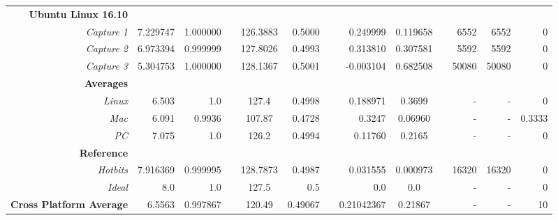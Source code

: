 \documentclass{IEEEtran}
\begin{document}
\begin{table*}[h!]
\begin{adjustwidth}{-1.25 cm}{}
\begin{tabular}{@{}rrrrcrrrcrrrr@{}}
\textbf{Ubuntu Linux 16.10}\\
\textit{Capture 1} & 7.229747 & 1.000000  && 126.3883 & 0.5000 && 0.249999 & 0.119658 && 6552 & 6552 & 0 \\
\textit{Capture 2}& 6.973394& 0.999999&& 127.8026& 0.4993&& 0.313810& 0.307581 && 5592 & 5592 &0\\
\textit{Capture 3}& 5.304753& 1.000000&& 128.1367& 0.5001&&-0.003104& 0.682508&& 50080 & 50080 & 0\\
\bottomrule
\textbf{Averages}\\
\textit{Linux}& 6.503 & 1.0 && 127.4 &0.4998  && 0.188971  & 0.3699 && - & - & 0\\
\textit{Mac}& 6.091 & 0.9936&& 107.87 &0.4728 && 0.3247 & 0.06960 && - & - & 0.3333\\
\textit{PC}& 7.075 & 1.0 && 126.2 &0.4994 && 0.11760 & 0.2165 && - & - & 0\\
\textbf{Reference}\\
\textit{Hotbits} & 7.916369 & 0.999995  && 128.7873 & 0.4987 && 0.031555 & 0.000973 && 16320 & 16320 & 0\\
\textit{Ideal}& 8.0& 1.0&& 127.5& 0.5&& 0.0& 0.0 && - & - & 0\\
\bottomrule
\textbf{Cross Platform Average}& 6.5563 & 0.997867 && 120.49 & 0.49067 && 0.21042367 &0.21867 && - & - & 10\\
\bottomrule
\end{tabular}
\end{adjustwidth}
\end{table*}



\newpage
\onecolumn
\end{document}
